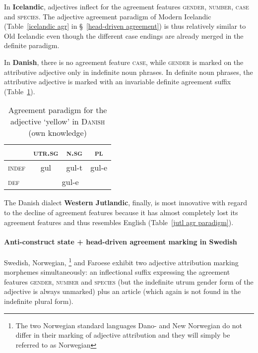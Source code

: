 In {\bf Icelandic}, adjectives inflect for the agreement features \textsc{gender}, \textsc{number}, \textsc{case} and \textsc{species}. The adjective agreement paradigm of Modern Icelandic (Table~\ref{icelandic agr} in \S~\ref{head-driven agreement}) is thus relatively similar to Old Icelandic even though the different case endings are already merged in the definite paradigm.

In {\bf Danish},\label{danish synchr} there is no agreement feature \textsc{case}, while \textsc{gender} is marked on the attributive adjective only in indefinite noun phrases. In definite noun phrases, the attributive adjective is marked with an invariable definite agreement suffix (Table~\ref{danish agr paradigm}). 

\begin{table}
\begin{center}
\begin{footnotesize}
\begin{tabular}[h]{l|c c c}
\hline
\hline
		& \textsc{utr.sg}	&\textsc{n.sg}	&\textsc{pl}\\
\hline
\textsc{indef}	&gul	 	&gul-t		&gul-e\\
\hline
\textsc{def}	&\multicolumn{3}{c}{gul-e}\\
\hline
\hline
\end{tabular}
\caption[Adjective paradigm for \textsc{Danish}]{Agreement paradigm for the adjective ‘yellow’ in \textsc{Danish} (own knowledge)}\label{danish agr paradigm}
\end{footnotesize}
\end{center}
\end{table}

The Danish dialect {\bf Western Jutlandic}, finally, is most innovative with regard to the decline of agreement features because it has almost completely lost its agreement features and thus resembles English (Table~\ref{jutl agr paradigm}).

\paragraph{Anti-construct state + head-driven agreement marking in Swedish}\label{swedish synchr}
Swedish, Norwegian,
\footnote{The two Norwegian standard languages Dano- and New Norwegian do not differ in their marking of adjective attribution and they will simply be referred to as Norwegian}
 and Faroese exhibit two adjective attribution marking morphemes simultaneously: an inflectional suffix expressing the agreement features \textsc{gender}, \textsc{number} and \textsc{species} (but the indefinite utrum gender form of the adjective is always unmarked) plus an article (which again is not found in the indefinite plural form).


